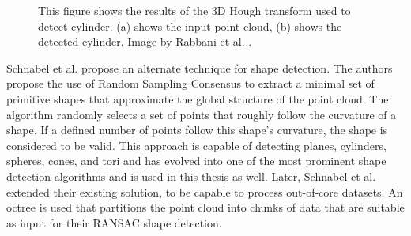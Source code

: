 \begin{figure}
\centering
{}
\caption[Results of 3d Hough transform used to detect cylinder]
{This figure shows the results of the 3D Hough transform used to detect cylinder. (a) shows the input point cloud, (b) shows the detected cylinder. Image by Rabbani et al. \cite{rabbani2005efficient}.}
\label{fig:hough_cylinder}
\end{figure}


Schnabel et al. \cite{schnabel-2007-efficient} propose an alternate technique for shape detection. The authors propose the use of Random Sampling Consensus \cite{fischler1981random} to extract a minimal set of primitive shapes that approximate the global structure of the point cloud. The algorithm randomly selects a set of points that roughly follow the curvature of a shape. If a defined number of points follow this shape's curvature, the shape is considered to be valid. This approach is capable of detecting planes, cylinders, spheres, cones, and tori and has evolved into one of the most prominent shape detection algorithms and is used in this thesis as well. Later, Schnabel et al. \cite{schnabel-2007-ransac} extended their existing solution, to be capable to process out-of-core datasets. An octree is used that partitions the point cloud into chunks of data that are suitable as input for their RANSAC shape detection. 

